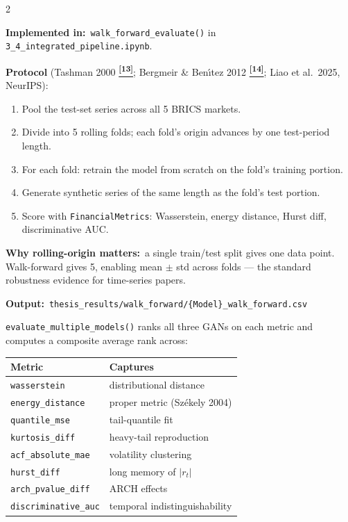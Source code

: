 \documentclass[10pt]{article}
\newcommand{\skybox}[2]{\begin{tcolorbox}[mybox={Sky}{BBg},title={#1}]#2\end{tcolorbox}}
\newcommand{\tealbox}[2]{\begin{tcolorbox}[mybox={Teal}{LBg},title={#1}]#2\end{tcolorbox}}
\newcommand{\tcite}[1]{%
  \hyperlink{R:#1}{\textsuperscript{\scriptsize\textbf{[#1]}}}}
\begin{document}
\begin{multicols}{2}
\columnbreak

\tealbox{Walk-Forward Temporal Validation (CTBench Protocol)}{%
\textbf{Implemented in:}\ \texttt{walk\_forward\_evaluate()} in \texttt{3\_4\_integrated\_pipeline.ipynb}.

\textbf{Protocol} (Tashman 2000\tcite{13}; Bergmeir \& Ben\'{\i}tez 2012\tcite{14}; Liao et al.\ 2025, NeurIPS):
\begin{enumerate}
  \item Pool the test-set series across all 5 BRICS markets.
  \item Divide into 5 rolling folds; each fold's origin advances by one test-period length.
  \item For each fold: retrain the model from scratch on the fold's training portion.
  \item Generate synthetic series of the same length as the fold's test portion.
  \item Score with \texttt{FinancialMetrics}: Wasserstein, energy distance, Hurst diff, discriminative AUC.
\end{enumerate}
\textbf{Why rolling-origin matters:}\ a single train/test split gives one data point. Walk-forward gives 5, enabling mean $\pm$ std across folds --- the standard robustness evidence for time-series papers.

\textbf{Output:}\ \texttt{thesis\_results/walk\_forward/\{Model\}\_walk\_forward.csv}}

\skybox{Composite Model Comparison Score}{%
\texttt{evaluate\_multiple\_models()} ranks all three GANs on each metric and computes a composite average rank across:

\smallskip
\begin{tabular}{@{}ll@{}}
\toprule
\textbf{Metric} & \textbf{Captures} \\
\midrule
\texttt{wasserstein}        & distributional distance \\
\texttt{energy\_distance}   & proper metric (Sz\'{e}kely 2004) \\
\texttt{quantile\_mse}      & tail-quantile fit \\
\texttt{kurtosis\_diff}     & heavy-tail reproduction \\
\texttt{acf\_absolute\_mae} & volatility clustering \\
\texttt{hurst\_diff}        & long memory of $|r_t|$ \\
\texttt{arch\_pvalue\_diff} & ARCH effects \\
\texttt{discriminative\_auc}& temporal indistinguishability \\
\bottomrule
\end{tabular}

}
\end{multicols}
\end{document}
